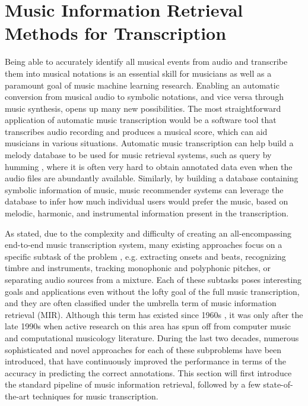 \section{Music Information Retrieval Methods for Transcription} \label{sec:review}

Being able to accurately identify all musical events from audio and transcribe them into musical notations is an essential skill for musicians as well as a paramount goal of music machine learning research.
Enabling an automatic conversion from musical audio to symbolic notations, and vice versa through music synthesis, opens up many new possibilities.
The most straightforward application of automatic music transcription would be a software tool that transcribes audio recording and produces a musical score, which can aid musicians in various situations.
Automatic music transcription can help build a melody database to be used for music retrieval systems, such as query by humming \cite{molina2014humming}, where it is often very hard to obtain annotated data even when the audio files are abundantly available.
Similarly, by building a database containing symbolic information of music, music recommender systems can leverage the database to infer how much individual users would prefer the music, based on melodic, harmonic, and instrumental information present in the transcription.

As stated, due to the complexity and difficulty of creating an all-encompassing end-to-end music transcription system, many existing approaches focus on a specific subtask of the problem \cite{casey2008mir}, e.g. extracting onsets and beats, recognizing timbre and instruments, tracking monophonic and polyphonic pitches, or separating audio sources from a mixture.
Each of these subtasks poses interesting goals and applications even without the lofty goal of the full music transcription, and they are often classified under the umbrella term of music information retrieval (MIR).
Although this term has existed since 1960s \cite{kassler1966mir}, it was only after the late 1990s when active research on this area has spun off from computer music and computational musicology literature.
During the last two decades, numerous sophisticated and novel approaches for each of these subproblems have been introduced, that have continuously improved the performance in terms of the accuracy in predicting the correct annotations.
This section will first introduce the standard pipeline of music information retrieval, followed by a few state-of-the-art techniques for music transcription.

